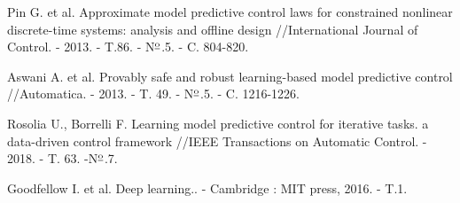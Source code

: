 \begin{biblio}
Pin G. et al. Approximate model predictive control laws for constrained nonlinear discrete-time systems: analysis and offline design //International Journal of Control. - 2013. - T.86. - N$\textsuperscript{\underline{o}}$.5. - C. 804-820.

Aswani A. et al. Provably safe and robust learning-based model predictive control //Automatica. - 2013. - T. 49. - N$\textsuperscript{\underline{o}}$.5. - C. 1216-1226.

Rosolia U., Borrelli F. Learning model predictive control for iterative tasks. a data-driven control framework //IEEE Transactions on Automatic Control. - 2018. - T. 63. -N$\textsuperscript{\underline{o}}$.7.

Goodfellow I. et al. Deep learning.. - Cambridge : MIT press, 2016. - T.1.

\end{biblio} 